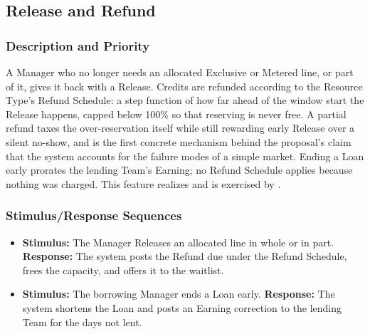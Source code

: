 \subsection{Release and Refund}\label{feat:release}

\subsubsection{Description and Priority}
A Manager who no longer needs an allocated Exclusive or Metered line, or part of it, gives it back with a Release. Credits are refunded according to the Resource Type's Refund Schedule: a step function of how far ahead of the window start the Release happens, capped below 100\% so that reserving is never free. A partial refund taxes the over-reservation itself while still rewarding early Release over a silent no-show, and is the first concrete mechanism behind the proposal's claim that the system accounts for the failure modes of a simple market. Ending a Loan early prorates the lending Team's Earning; no Refund Schedule applies because nothing was charged. This feature realizes  and is exercised by . 

\subsubsection{Stimulus/Response Sequences}
\begin{itemize}
  \item \textbf{Stimulus:} The Manager Releases an allocated line in whole or in part. \textbf{Response:} The system posts the Refund due under the Refund Schedule, frees the capacity, and offers it to the waitlist.
  \item \textbf{Stimulus:} The borrowing Manager ends a Loan early. \textbf{Response:} The system shortens the Loan and posts an Earning correction to the lending Team for the days not lent.
\end{itemize}


